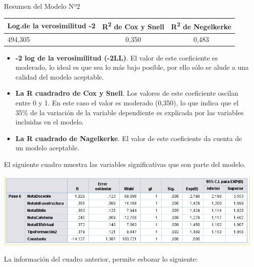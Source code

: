 \documentclass[]{book}
\begin{document}
Resumen del Modelo Nº2

\begin{longtable}[]{@{}lcc@{}}
\toprule
Log.de la verosimilitud -2 & R\textsuperscript{2} de Cox y Snell &
R\textsuperscript{2} de Negelkerke\tabularnewline
\midrule
\endhead
494,305 & 0,350 & 0,483\tabularnewline
\bottomrule
\end{longtable}

\begin{itemize}
\item
  \textbf{-2 log de la verosimilitud (-2LL)}. El valor de este
  coeficiente es moderado, lo ideal es que sea lo más bajo posible, por
  ello sólo se alude a una calidad del modelo aceptable.
\item
  \textbf{La R cuadradro de Cox y Snell}. Los valores de este
  coeficiente oscilan entre 0 y 1. En este caso el valor es moderado
  (0,350), lo que indica que el 35\% de la variación de la variable
  dependiente es explicada por las variables incluidas en el modelo.
\item
  \textbf{La R cuadrado de Nagelkerke}. El valor de este coeficiente da
  cuenta de un modelo aceptable.
\end{itemize}

El siguiente cuadro muestra las variables significativas que son parte
del modelo.

\begin{center}\includegraphics{images/Modelo2} \end{center}

La información del cuadro anterior, permite esbozar lo siguiente:
\end{document}
